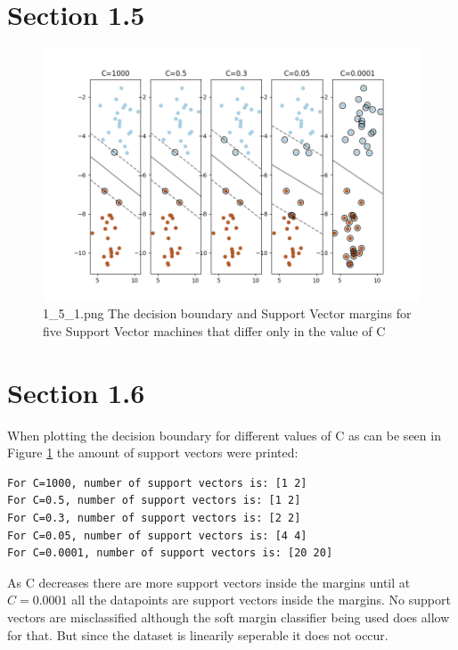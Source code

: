\documentclass{article}
\begin{document}
\section*{Section 1.5}
\begin{figure}[H]
    \centering
    \includegraphics[width=\textwidth]{08_SVM/1_5_1.png}
    \caption{1\_5\_1.png The decision boundary and Support Vector margins for five Support Vector machines that differ only in the value of C}
    \label{fig:section15}
\end{figure}

\section*{Section 1.6}
When plotting the decision boundary for different values of C as can be seen in Figure \ref{fig:section15} the amount of support vectors were printed:
\begin{verbatim}
For C=1000, number of support vectors is: [1 2]
For C=0.5, number of support vectors is: [1 2]
For C=0.3, number of support vectors is: [2 2]
For C=0.05, number of support vectors is: [4 4]
For C=0.0001, number of support vectors is: [20 20]
\end{verbatim}

As C decreases there are more support vectors inside the margins until at $C=0.0001$ all the datapoints are support vectors inside the margins. No support vectors are misclassified although the soft margin classifier being used does allow for that. But since the dataset is linearily seperable it does not occur.

\newpage
\end{document}
